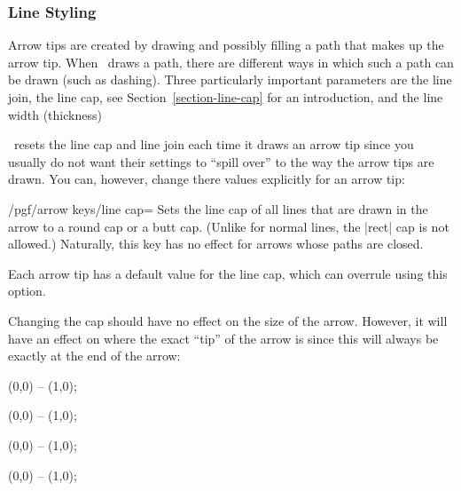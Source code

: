 \subsubsection{Line Styling}
\label{section-arrow-key-caps}

Arrow tips are created by drawing and possibly filling a path that
makes up the arrow tip. When \tikzname\ draws a path, there are
different ways in which such a path can be drawn (such as
dashing). Three particularly important parameters are the line join,
the line cap, see Section~\ref{section-line-cap} for an introduction,
and the line width (thickness) 

\tikzname\ resets the line cap and line join each time it draws an
arrow tip since you usually do not want their settings to ``spill
over'' to the way the arrow tips are drawn. You can, however, change
there values explicitly for an arrow tip:

\begin{key}{/pgf/arrow keys/line cap=}
  Sets the line cap of all lines that are drawn in the arrow to a
  round cap or a butt cap. (Unlike for normal lines, the |rect| cap is
  not allowed.) Naturally, this key has no effect for arrows whose
  paths are closed.

  Each arrow tip has a default value for the line cap, which can
  overrule using this option.

  Changing the cap should have no effect on the size of the
  arrow. However, it will have an effect on where the exact ``tip'' of
  the arrow is since this will always be exactly at the end of the
  arrow:
\begin{codeexample}[width=3cm]
\tikz [line width=2mm]
  \draw [arrows = {-Computer Modern Rightarrow[line cap=butt]}]
        (0,0) -- (1,0);
\end{codeexample}
\begin{codeexample}[width=3cm]
\tikz [line width=2mm]
  \draw [arrows = {-Computer Modern Rightarrow[line cap=round]}]
        (0,0) -- (1,0);
\end{codeexample}
\begin{codeexample}[width=3cm]
\tikz [line width=2mm]
  \draw [arrows = {-Bracket[reversed,line cap=butt]}]
        (0,0) -- (1,0);
\end{codeexample}
\begin{codeexample}[width=3cm]
\tikz [line width=2mm]
  \draw [arrows = {-Bracket[reversed,line cap=round]}]
        (0,0) -- (1,0);
\end{codeexample}
\end{key}

